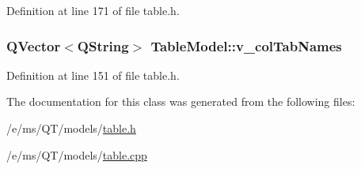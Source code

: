 Definition at line 171 of file table.h.

\hypertarget{classTableModel_a8cdd6044f20e1442e77bab8f74a3d2fe}{
\subsubsection[{v\_\-colTabNames}]{\setlength{\rightskip}{0pt plus 5cm}QVector$<$QString$>$ {\bf TableModel::v\_\-colTabNames}}}
\label{classTableModel_a8cdd6044f20e1442e77bab8f74a3d2fe}


Definition at line 151 of file table.h.



The documentation for this class was generated from the following files:\begin{DoxyCompactItemize}
\item 
/e/ms/QT/models/\hyperlink{table_8h}{table.h}\item 
/e/ms/QT/models/\hyperlink{table_8cpp}{table.cpp}\end{DoxyCompactItemize}
